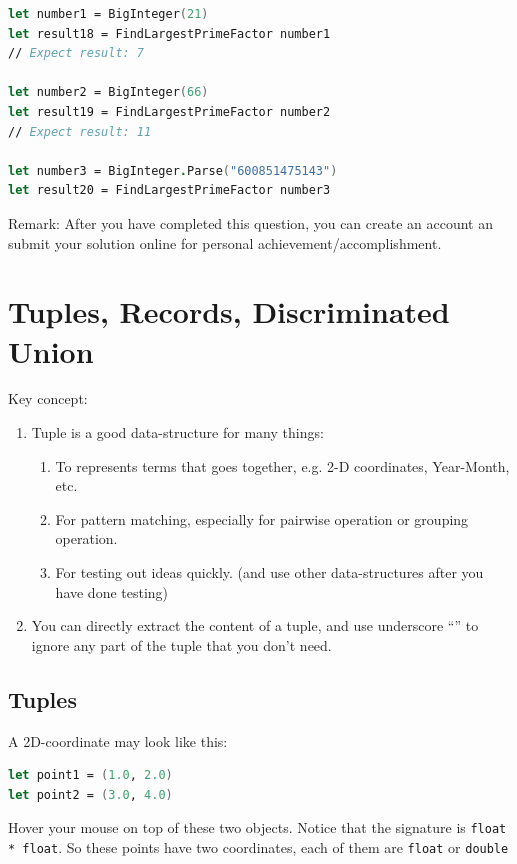 \documentclass[12pt]{article}
\begin{document}
\begin{lstlisting}[language=FSharp]
let number1 = BigInteger(21)
let result18 = FindLargestPrimeFactor number1  
// Expect result: 7

let number2 = BigInteger(66)
let result19 = FindLargestPrimeFactor number2
// Expect result: 11

let number3 = BigInteger.Parse("600851475143")
let result20 = FindLargestPrimeFactor number3
\end{lstlisting}

Remark: After you have completed this question, you can create an account an submit your solution online for personal achievement/accomplishment.
\pagebreak

\section{Tuples, Records, Discriminated Union}
Key concept:
\begin{enumerate}
\item Tuple is a good data-structure for many things:
\begin{enumerate}
\item To represents terms that goes together, e.g. 2-D coordinates, Year-Month, etc.
\item For pattern matching, especially for pairwise operation or grouping operation.
\item For testing out ideas quickly. (and use other data-structures after you have done testing)
\end{enumerate} 
\item You can directly extract the content of a tuple, and use underscore ``\underline{\:\:}'' to ignore any part of the tuple that you don't need.
\end{enumerate}

\subsection{Tuples}
A 2D-coordinate may look like this:
\begin{lstlisting}[language=FSharp]
let point1 = (1.0, 2.0)
let point2 = (3.0, 4.0)
\end{lstlisting}
Hover your mouse on top of these two objects. Notice that the signature is \texttt{float * float}. So these points have two coordinates, each of them are \texttt{float} or \texttt{double}
\end{document}
